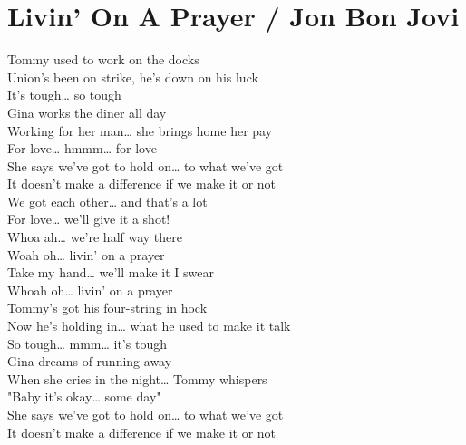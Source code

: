 \section{Livin' On A Prayer / Jon Bon Jovi}\label{sec:livinonaprayer}

\BflatMajor
\Cmajor
\DmajorEasy
\EflatMajor
\Eminor
\Fmajor
\Gmajor
\Gminor

 Tommy used to work on the docks\\
 Union's been on strike, he's down on his luck\\
It's  tough…   so  tough\\
 Gina works the diner all day\\
 Working for her man… she brings home her pay\\
For  love…  hmmm… for   love\\
She says we've got to  hold  on… to what we've  got\\
It  doesn't make a  difference if we make it or  not\\
We  got each  other… and that's a  lot\\
For  love… we'll  give it a shot!\\
 Whoa ah… we're  half way there\\
 Woah  oh…  livin' on a prayer\\
 Take my  hand… we'll  make it I swear\\
 Whoah  oh…  livin' on a prayer\\
 Tommy's got his four-string in hock\\
 Now he's holding in… what he used to make it talk\\
So  tough…   mmm… it's  tough\\
 Gina dreams of running away\\
 When she cries in the night… Tommy whispers\\
"Baby it's  okay…   some  day"\\
She says we've got to  hold  on… to what we've  got\\
It  doesn't make a  difference if we make it or  not\\
